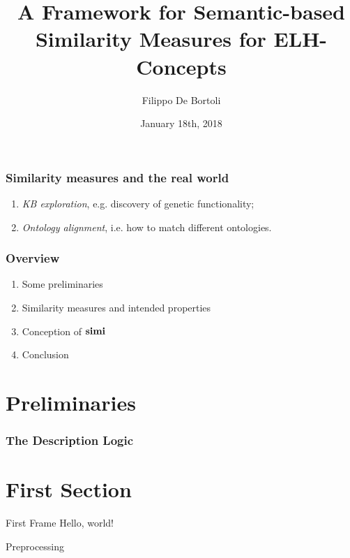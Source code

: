 \documentclass{beamer}
\title{A Framework for Semantic-based Similarity Measures for ELH-Concepts}
\author{Filippo De Bortoli}
\institute{European Master's Programme in Computational Logic, TU Dresden}
\date{January 18th, 2018}
\begin{document}
\maketitle

\begin{frame}
  \frametitle{Similarity measures and the real world}
  \begin{enumerate}
    \item \emph{KB exploration}, e.g. discovery of genetic functionality;
    \item \emph{Ontology alignment}, i.e. how to match different ontologies.
  \end{enumerate}
\end{frame}

\begin{frame}
  \frametitle{Overview}
  \begin{enumerate}
    \item Some preliminaries
    \item Similarity measures and intended properties
    \item Conception of \(\operatorname{\mathbf{simi}}\)
    \item Conclusion
  \end{enumerate}
\end{frame}

\section{Preliminaries}

\begin{frame}
  \frametitle{The \elh{} Description Logic}
\end{frame}

\section{First Section}
\begin{frame}{First Frame}
Hello, world!
\end{frame}

\begin{frame}{Preprocessing}
\end{frame}
\end{document}
